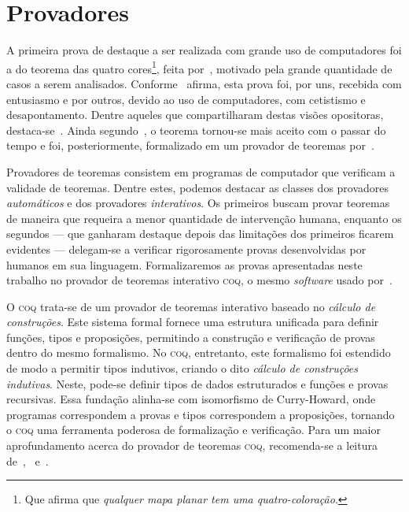 \section{Provadores}

A primeira prova de destaque a ser realizada com grande uso de computadores foi a do teorema das quatro cores\footnote{Que afirma que \emph{qualquer mapa planar tem uma quatro-coloração}.}, feita por~\cite{Appel}, motivado pela grande quantidade de casos a serem analisados. Conforme~\cite{Wilson} afirma, esta prova foi, por uns, recebida com entusiasmo e por outros, devido ao uso de computadores, com cetistismo e desapontamento. Dentre aqueles que compartilharam destas visões opositoras, destaca-se~\cite{Tymoczko}. Ainda segundo~\cite{Wilson}, o teorema tornou-se mais aceito com o passar do tempo e foi, posteriormente, formalizado em um provador de teoremas por~\cite{Gonthier}.

Provadores de teoremas consistem em programas de computador que verificam a validade de teoremas. Dentre estes, podemos destacar as classes dos provadores \emph{automáticos} e dos provadores \emph{interativos}. Os primeiros buscam provar teoremas de maneira que requeira a menor quantidade de intervenção humana, enquanto os segundos --- que ganharam destaque depois das limitações dos primeiros ficarem evidentes --- delegam-se a verificar rigorosamente provas desenvolvidas por humanos em sua linguagem. Formalizaremos as provas apresentadas neste trabalho no provador de teoremas interativo \textsc{coq}, o mesmo \emph{software} usado por~\cite{Gonthier}.

O \textsc{coq} trata-se de um provador de teoremas interativo baseado no \emph{cálculo de construções}. Este sistema formal fornece uma estrutura unificada para definir funções, tipos e proposições, permitindo a construção e verificação de provas dentro do mesmo formalismo. No \textsc{coq}, entretanto, este formalismo foi estendido de modo a permitir tipos indutivos, criando o dito \emph{cálculo de construções indutivas}. Neste, pode-se definir tipos de dados estruturados e funções e provas recursivas. Essa fundação alinha-se com isomorfismo de Curry-Howard, onde programas correspondem a provas e tipos correspondem a proposições, tornando o \textsc{coq} uma ferramenta poderosa de formalização e verificação. Para um maior aprofundamento acerca do provador de teoremas \textsc{coq}, recomenda-se a leitura de~\cite{Chlipala},~\cite{Pierce} e~\cite{Coq}.
